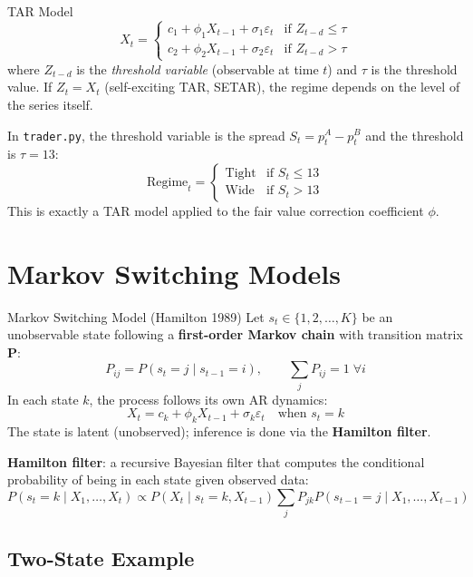 \documentclass[12pt,a4paper,openany]{report}
\theoremstyle{definition}
\begin{document}
\begin{definitionbox}{TAR Model}
\[
  X_t = \begin{cases}
    c_1 + \phi_1 X_{t-1} + \sigma_1\varepsilon_t & \text{if } Z_{t-d} \leq \tau \\
    c_2 + \phi_2 X_{t-1} + \sigma_2\varepsilon_t & \text{if } Z_{t-d} > \tau
  \end{cases}
\]
where $Z_{t-d}$ is the \emph{threshold variable} (observable at time $t$) and $\tau$ is the threshold value. If $Z_t = X_t$ (self-exciting TAR, SETAR), the regime depends on the level of the series itself.
\end{definitionbox}

In \texttt{trader.py}, the threshold variable is the spread $S_t = p_t^A - p_t^B$ and the threshold is $\tau = 13$:
\begin{equation}
  \text{Regime}_t = \begin{cases} \text{Tight} & \text{if } S_t \leq 13 \\ \text{Wide}  & \text{if } S_t > 13 \end{cases}
\end{equation}
This is exactly a TAR model applied to the fair value correction coefficient $\phi$.

\section{Markov Switching Models}

\begin{definitionbox}{Markov Switching Model (Hamilton 1989)}
Let $s_t \in \{1, 2, \ldots, K\}$ be an unobservable state following a \textbf{first-order Markov chain} with transition matrix $\mathbf{P}$:
\[
  P_{ij} = P(s_t = j \mid s_{t-1} = i), \qquad \sum_j P_{ij} = 1 \;\forall i
\]
In each state $k$, the process follows its own AR dynamics:
\[
  X_t = c_k + \phi_k X_{t-1} + \sigma_k\varepsilon_t \quad \text{when } s_t = k
\]
The state is latent (unobserved); inference is done via the \textbf{Hamilton filter}.
\end{definitionbox}

\textbf{Hamilton filter}: a recursive Bayesian filter that computes the conditional probability of being in each state given observed data:
\[
  P(s_t = k \mid X_1, \ldots, X_t) \propto P(X_t \mid s_t = k, X_{t-1}) \sum_j P_{jk} P(s_{t-1} = j \mid X_1, \ldots, X_{t-1})
\]

\subsection{Two-State Example}
\end{document}
